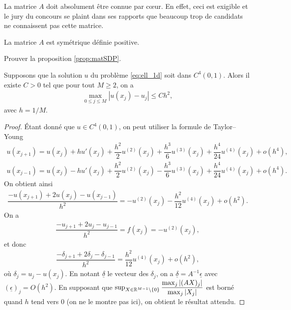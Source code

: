 \documentclass[12pt,a4paper,twoside]{article}
\begin{document}
\begin{remark}
  La matrice $A$ doit absolument \^etre connue par c\oe{}ur.
  En effet, ceci est exigible et le jury du concours se plaint dans ses rapports
  que beaucoup trop de candidats ne connaissent pas cette matrice.
\end{remark}

\begin{proposition}
  \label{prop:matSDP}
  La matrice $A$ est sym\'etrique d\'efinie positive.
\end{proposition}


\begin{exercise}
  Prouver la proposition \ref{prop:matSDP}.
\end{exercise}

\begin{proposition}[Convergence]
  \label{prop:ell_conv}
  Supposons que la solution $u$ du probl\`eme \eqref{eq:ell_1d} soit 
  dans $C^4(0,1)$.
  Alors il existe $C>0$ tel que pour tout $M \geq 2$, on a
  \begin{align*}
    \max_{0 \leq j \leq M} | u(x_j) - u_j | \leq C h^2 ,
  \end{align*}
  avec $h = 1/M$.
\end{proposition}

\begin{proof}
  \'Etant donn\'e que $u \in C^{4}(0,1)$, on peut utiliser la formule de Taylor--Young
  \begin{align*}
    u(x_{j+1}) = u(x_j) + h u'(x_j) + \dfrac{h^2}{2} u^{(2)}(x_j) + \dfrac{h^3}{6} u^{(3)}(x_j)
    + \dfrac{h^4}{24} u^{(4)}(x_j) + o(h^4) ,
    \\
    u(x_{j-1}) = u(x_j) - h u'(x_j) + \dfrac{h^2}{2} u^{(2)}(x_j) - \dfrac{h^3}{6} u^{(3)}(x_j)
    + \dfrac{h^4}{24} u^{(4)}(x_j) + o(h^4) .
  \end{align*}
  On obtient ainsi
  \begin{align*}
    \dfrac{-u(x_{j+1}) + 2 u(x_j) - u(x_{j-1})}{h^2} = - u^{(2)}(x_j) - \dfrac{h^2}{12} u^{(4)}(x_j)
    + o (h^2) .
  \end{align*}
  On a 
  \begin{align*}
    \dfrac{- u_{j+1} + 2 u_j - u_{j-1}}{h^2} = f(x_j) = - u^{(2)}(x_j) ,
  \end{align*}
  et donc
  \begin{align*}
    \dfrac{-\delta_{j+1} + 2 \delta_j - \delta_{j-1}}{h^2} = \dfrac{h^2}{12} u^{(4)}(x_j) + o(h^2) ,
  \end{align*}
  o\`u $\delta_j = u_j - u(x_j)$.
  En notant $\underline{\delta}$ le vecteur des $\delta_j$,
  on a $\underline{\delta} = A^{-1} \underline{\epsilon}$
  avec $(\underline{\epsilon})_j = O(h^2)$.
  En supposant que $\sup_{X \in \mathbb{R}^{M-1}\backslash \{0\}} \dfrac{\max_{j} |(AX)_j|}{\max_j |X_j|}$
  est born\'e quand $h$ tend vers $0$ (on ne le montre pas ici), on obtient le r\'esultat attendu.
\end{proof}
\end{document}
